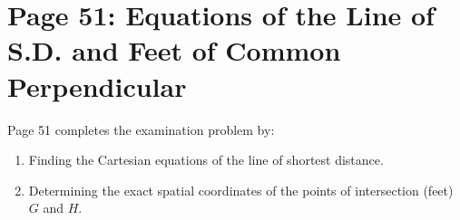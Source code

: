 \section{Page 51: Equations of the Line of S.D. and Feet of Common Perpendicular}
\label{sec:page51}

\begin{conceptbox}
Page 51 completes the examination problem by:
\begin{enumerate}[noitemsep]
    \item Finding the Cartesian equations of the line of shortest distance.
    \item Determining the exact spatial coordinates of the points of intersection (feet) $G$ and $H$.
\end{enumerate}
\end{conceptbox}

